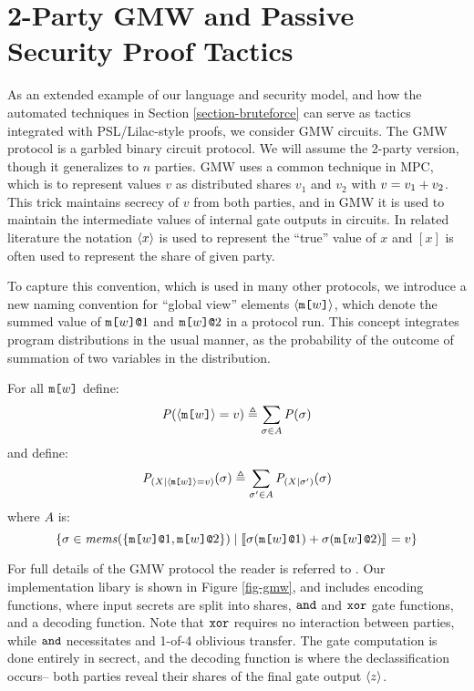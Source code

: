 \section{2-Party GMW and Passive Security Proof Tactics}
\label{section-metalang-gmw}
\label{section-example-gmw}



As an extended example of our language and security model, and how the
automated techniques in Section \ref{section-bruteforce} can serve
as tactics integrated with PSL/Lilac-style proofs, we consider GMW
circuits.  The GMW protocol is a garbled binary circuit protocol.  We
will assume the 2-party version, though it generalizes to $n$
parties\cite{XXX}. GMW uses a common technique in MPC, which is to
represent values $v$ as distributed shares $v_1$ and $v_2$ with $v =
v_1 + v_2$. This trick maintains secrecy of $v$ from both
parties, and in GMW it is used to maintain the intermediate values of
internal gate outputs in circuits. In related literature the notation
$\langle x \rangle$ is used to represent the ``true'' value of $x$ and $[x]$
is often used to represent the share of given party.

To capture this convention, which is used in many other protocols, we
introduce a new naming convention for ``global view'' elements
$\langle \texttt{m[}w\texttt{]} \rangle$, which denote the summed value of
$\texttt{m[}w\texttt{]}\texttt{@}1$ and $\texttt{m[}w\texttt{]}\texttt{@}2$ in a protocol
run. This concept integrates program distributions in the
usual manner, as the probability of the outcome of summation
of two variables in the distribution.
\begin{definition}
  For all $\texttt{m[}w\texttt{]}$ define:
  $$\mathit{P}(\langle \texttt{m[}w\texttt{]} \rangle = v) \triangleq \sum_{\sigma \in A} \mathit{P}(\sigma)$$
  and define:
  $$\mathit{P}_{({X}|{\langle \texttt{m[}w\texttt{]} \rangle = v})}(\sigma) \triangleq  \sum_{\sigma' \in A} \mathit{P}_{({X}|{\sigma'})}(\sigma)$$
  where $A$ is:
  $$\{ \sigma \in \mathit{mems}(\{ \texttt{m[}w\texttt{]}\texttt{@}1,\texttt{m[}w\texttt{]}\texttt{@}2 \} ) \mid
      \llbracket \sigma(\texttt{m[}w\texttt{]}\texttt{@}1) + \sigma(\texttt{m[}w\texttt{]}\texttt{@}2) \rrbracket_{} = v \}$$
\end{definition}

For full details of the GMW protocol the reader is referred to
\cite{evans2018pragmatic}. Our implementation libary is shown in
Figure \ref{fig-gmw}, and includes encoding functions, where
input secrets are split into shares, $\texttt{and}$ and $\texttt{xor}$ gate
functions, and a decoding function. Note that $\texttt{xor}$ requires
no interaction between parties, while $\texttt{and}$ necessitates and
1-of-4 oblivious transfer. The gate computation is
done entirely in secrect, and the decoding function
is where the declassification occurs-- both parties reveal
their shares of the final gate output $\langle z \rangle$.

